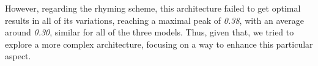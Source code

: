 However, regarding the rhyming scheme, this architecture failed to get optimal results in all of its variations, reaching a maximal peak of \textit{0.38}, with an average around \textit{0.30}, similar for all of the three models.
Thus, given that, we tried to explore a more complex architecture, focusing on a way to enhance this particular aspect.